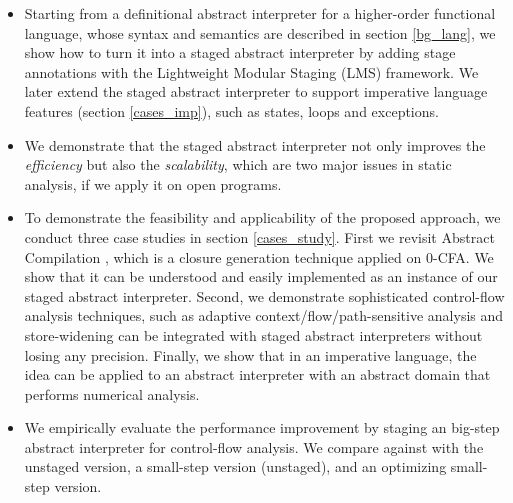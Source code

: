 \begin{itemize}
\item Starting from a definitional abstract interpreter for a higher-order functional language,
  whose syntax and semantics are described in section \ref{bg_lang},
  we show how to turn it into a staged abstract interpreter by adding stage annotations with
  the Lightweight Modular Staging (LMS) framework. %
  We later extend the staged abstract interpreter to support imperative language features 
  (section \ref{cases_imp}), such as states, loops and exceptions.
\item We demonstrate that the staged abstract interpreter not only improves the \textit{efficiency}
  but also the \textit{scalability}, which are two major issues in static analysis, if we apply it on open
  programs. 
\item To demonstrate the feasibility and applicability of the proposed approach, we conduct three case studies in section \ref{cases_study}. 
  First we revisit Abstract Compilation \cite{Boucher:1996:ACN:647473.727587}, which is a closure generation 
  technique applied on 0-CFA. We show that it can be understood and easily implemented as an instance of 
  our staged abstract interpreter. 
  Second, we demonstrate sophisticated control-flow analysis techniques, such as adaptive context/flow/path-sensitive 
  analysis and store-widening can be integrated with staged abstract interpreters without losing any precision.
  Finally, we show that in an imperative language, the idea can be applied to an abstract interpreter with
  an abstract domain that performs numerical analysis.
\item We empirically evaluate the performance improvement by staging an big-step abstract interpreter 
  for control-flow analysis. We compare against with the unstaged version, a small-step version (unstaged), 
  and an optimizing small-step version.
\end{itemize}
